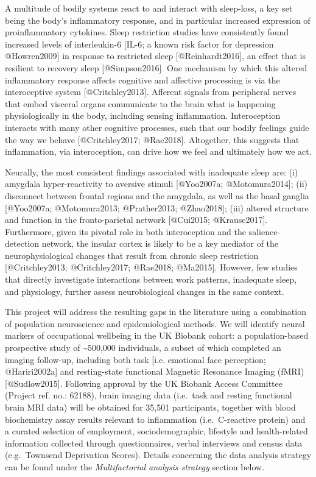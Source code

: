 \documentclass[
]{article}
\begin{document}
A multitude of bodily systems react to and interact with sleep-loss, a
key set being the body's inflammatory response, and in particular
increased expression of proinflammatory cytokines. Sleep restriction
studies have consistently found increased levels of interleukin-6
{[}IL-6; a known risk factor for depression @Howren2009{]} in response
to restricted sleep {[}@Reinhardt2016{]}, an effect that is resilient to
recovery sleep {[}@Simpson2016{]}. One mechanism by which this altered
inflammatory response affects cognitive and affective processing is via
the interoceptive system {[}@Critchley2013{]}. Afferent signals from
peripheral nerves that embed visceral organs communicate to the brain
what is happening physiologically in the body, including sensing
inflammation. Interoception interacts with many other cognitive
processes, such that our bodily feelings guide the way we behave
{[}@Critchley2017; @Rae2018{]}. Altogether, this suggests that
inflammation, via interoception, can drive how we feel and ultimately
how we act.

Neurally, the most consistent findings associated with inadequate sleep
are: (i) amygdala hyper-reactivity to aversive stimuli {[}@Yoo2007a;
@Motomura2014{]}; (ii) disconnect between frontal regions and the
amygdala, as well as the basal ganglia {[}@Yoo2007a; @Motomura2013;
@Prather2013; @Zhao2018{]}; (iii) altered structure and function in the
fronto-parietal network {[}@Cui2015; @Krause2017{]}. Furthermore, given
its pivotal role in both interoception and the salience-detection
network, the insular cortex is likely to be a key mediator of the
neurophysiological changes that result from chronic sleep restriction
{[}@Critchley2013; @Critchley2017; @Rae2018; @Ma2015{]}. However, few
studies that directly investigate interactions between work patterns,
inadequate sleep, and physiology, further assess neurobiological changes
in the same context.

This project will address the resulting gaps in the literature using a
combination of population neuroscience and epidemiological methods. We
will identify neural markers of occupational wellbeing in the UK Biobank
cohort: a population-based prospective study of \textasciitilde500,000
individuals, a subset of which completed an imaging follow-up, including
both task {[}i.e. emotional face perception; @Hariri2002a{]} and
resting-state functional Magnetic Resonance Imaging (fMRI)
{[}@Sudlow2015{]}. Following approval by the UK Biobank Access Committee
(Project ref. no.: 62188), brain imaging data (i.e.~task and resting
functional brain MRI data) will be obtained for 35,501 participants,
together with blood biochemistry assay results relevant to inflammation
(i.e.~C-reactive protein) and a curated selection of employment,
sociodemographic, lifestyle and health-related information collected
through questionnaires, verbal interviews and census data (e.g.~Townsend
Deprivation Scores). Details concerning the data analysis strategy can
be found under the \emph{Multifactorial analysis strategy} section
below.
\end{document}

